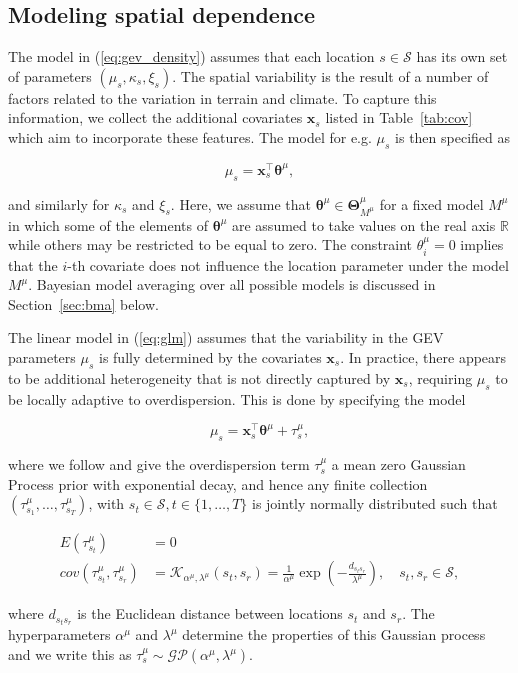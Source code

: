 \documentclass[11pt,english]{article}
\newcommand{\bs}[1]{\boldsymbol{#1}}
\newcommand{\mc}[1]{\mathcal{#1}}
\newcommand{\real}{\mathbb{R}}
\newcommand{\bl}{\begin{linenomath}}
\newcommand{\el}{\end{linenomath}}
\begin{document}
\subsection{Modeling spatial dependence}\label{sec:gp}

The model in (\ref{eq:gev_density}) assumes that each location $s \in\mathcal{S}$ has its own set of parameters $(\mu_s, \kappa_s, \xi_s)$.  The spatial variability is the result of a number of factors related to the variation in terrain and climate.  To capture this information, we collect the additional covariates $\bs{x}_{s}$ listed in Table~\ref{tab:cov} which aim to incorporate these features.  The model for e.g. $\mu_s$ is then specified as
\bl\begin{equation}
\mu_s = \bs{x}^\top_s\bs{\theta}^{\mu} \label{eq:glm}, 
\end{equation}\el
and similarly for $\kappa_s$ and $\xi_s$. Here, we assume that $\bs{\theta}^{\mu} \in \bs{\Theta}^{\mu}_{M^\mu}$ for a fixed model $M^\mu$ in which some of the elements of $\bs{\theta}^{\mu}$ are assumed to take values on the real axis $\real$ while others may be restricted to be equal to zero. The constraint $\theta^\mu_i = 0$ implies that the $i$-th covariate does not influence the location parameter under the model $M^\mu$. Bayesian model averaging over all possible models is discussed in Section~\ref{sec:bma} below.   

The linear model in (\ref{eq:glm}) assumes that the variability in the GEV parameters $\mu_s$ is fully determined by the covariates $\bs{x}_s$.  In practice, there appears to be additional heterogeneity that is not directly captured by $\bs{x}_s$, requiring $\mu_s$ to be locally adaptive to overdispersion.  This is done by specifying the model
\bl\begin{equation}\label{eq:mu model}
\mu_s = \bs{x}^\top_s \bs{\theta}^\mu + \tau^{\mu}_s,
\end{equation}\el
where we follow \citet{Davisonetal2012} and give the overdispersion term $\tau^{\mu}_{s}$ a mean zero Gaussian Process prior with exponential decay, and hence any finite collection $(\tau_{s_1}^{\mu}, \dots, \tau_{s_T}^{\mu})$, with $s_t \in \mathcal{S}, t\in\{1,\dots,T\}$ is jointly normally distributed such that
\bl\begin{align}
E(\tau_{s_t}^{\mu}) &= 0 \label{eq:GPmean} \\
cov(\tau_{s_t}^{\mu}, \tau_{s_r}^{\mu}) &= \mc{K}_{\alpha^\mu,\lambda^\mu}(s_t,s_r) = \frac{1}{\alpha^{\mu}} \exp\left(-\frac{d_{s_ts_r}}{\lambda^{\mu}}\right),\quad s_t,s_r\in\mathcal{S}, \label{eq:GPcov}
\end{align}\el
where $d_{s_ts_r}$ is the Euclidean distance between locations $s_t$ and $s_r$.  The hyperparameters $\alpha^{\mu}$ and $\lambda^{\mu}$ determine the properties of this Gaussian process and we write this as $\tau_s^{\mu}\sim \mathcal{G}\mathcal{P}(\alpha^{\mu}, \lambda^{\mu})$.  
\end{document}
